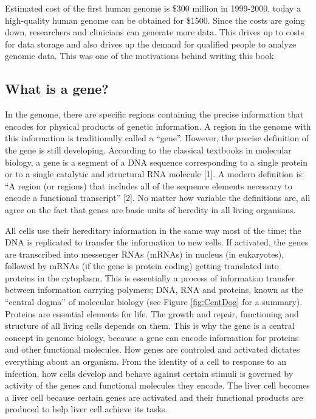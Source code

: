 \documentclass[12pt,]{krantz}
\theoremstyle{definition}
\theoremstyle{definition}
\theoremstyle{definition}
\theoremstyle{remark}
\begin{document}
Estimated cost of the first human genome is \$300 million in 1999-2000,
today a high-quality human genome can be obtained for \$1500. Since the
costs are going down, researchers and clinicians can generate more data.
This drives up to costs for data storage and also drives up the demand
for qualified people to analyze genomic data. This was one of the
motivations behind writing this book.

\hypertarget{what-is-a-gene}{%
\subsection{What is a gene?}\label{what-is-a-gene}}

In the genome, there are specific regions containing the precise
information that encodes for physical products of genetic information. A
region in the genome with this information is traditionally called a
``gene''. However, the precise definition of the gene is still
developing. According to the classical textbooks in molecular biology, a
gene is a segment of a DNA sequence corresponding to a single protein or
to a single catalytic and structural RNA molecule {[}1{]}. A modern
definition is: ``A region (or regions) that includes all of the sequence
elements necessary to encode a functional transcript'' {[}2{]}. No
matter how variable the definitions are, all agree on the fact that
genes are basic units of heredity in all living organisms.

All cells use their hereditary information in the same way most of the
time; the DNA is replicated to transfer the information to new cells. If
activated, the genes are transcribed into messenger RNAs (mRNAs) in
nucleus (in eukaryotes), followed by mRNAs (if the gene is protein
coding) getting translated into proteins in the cytoplasm. This is
essentially a process of information transfer between information
carrying polymers; DNA, RNA and proteins, known as the ``central dogma''
of molecular biology (see Figure \ref{fig:CentDog} for a summary).
Proteins are essential elements for life. The growth and repair,
functioning and structure of all living cells depends on them. This is
why the gene is a central concept in genome biology, because a gene can
encode information for proteins and other functional molecules. How
genes are controled and activated dictates everything about an organism.
From the identity of a cell to response to an infection, how cells
develop and behave against certain stimuli is governed by activity of
the genes and functional molecules they encode. The liver cell becomes a
liver cell because certain genes are activated and their functional
products are produced to help liver cell achieve its tasks.
\end{document}

